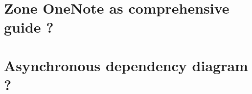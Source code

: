 \appendix
\chapter{Zone OneNote as comprehensive guide ?}


\chapter{Asynchronous dependency diagram ?}

